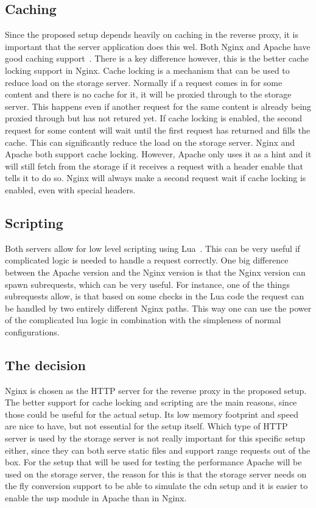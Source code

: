 \documentclass[twoside,openright]{uva-bachelor-thesis}
\begin{document}
\subsection{Caching}
Since the proposed setup depends heavily on caching in the reverse proxy, it is
important that the server application does this wel. Both Nginx and Apache have
good caching support~\autocites{nginxcache}{apachecache}. There is a key
difference however, this is the better cache locking support in Nginx. Cache
locking is a mechanism that can be used to reduce load on the storage server.
Normally if a request comes in for some content and there is no cache for it,
it will be proxied through to the storage server. This happens even if another
request for the same content is already being proxied through but has not
retured yet. If cache locking is enabled, the second request for some content
will wait until the first request has returned and fills the cache. This can
significantly reduce the load on the storage server. Nginx and Apache both
support cache locking. However, Apache only uses it as a hint and it will still
fetch from the storage if it receives a request with a header enable that tells
it to do so. Nginx will always make a second request wait if cache locking is
enabled, even with special headers.


\subsection{Scripting}
Both servers allow for low level scripting using
Lua~\autocites{nginxlua}{cloudflarelua}{apachelua}. This can be very useful if
complicated logic is needed to handle a request correctly. One big difference
between the Apache version and the Nginx version is that the Nginx version
can spawn subrequests, which can be very useful. For instance, one of the things
subrequests allow, is that based on some checks in the Lua code the request can
be handled by two entirely different Nginx paths. This way one can use the power
of the complicated lua logic in combination with the simpleness of normal
configurations.


\subsection{The decision}
Nginx is chosen as the HTTP server for the reverse proxy in the proposed setup.
The better support for cache locking and scripting are the main reasons, since
those could be useful for the actual setup. Its low memory footprint and speed
are nice to have, but not essential for the setup itself.  Which type of HTTP
server is used by the storage server is not really important for this specific
setup either, since they can both serve static files and support range requests
out of the box. For the setup that will be used for testing the performance
Apache will be used on the storage server, the reason for this is that the
storage server needs on the fly conversion support to be able to simulate the
\gls{cdn} setup and it is easier to enable the \gls{usp} module in Apache than
in Nginx.
\end{document}

